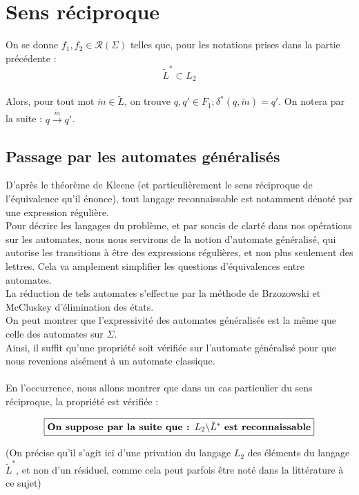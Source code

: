 \documentclass{article}
\begin{document}
\section{Sens réciproque}
On se donne $f_1,f_2 \in \mathcal{R}(\Sigma)$ telles que, pour les notations prises dans la partie précédente :
$$\tilde{L}^* \subset L_2$$
\\
Alors, pour tout mot $\tilde{m} \in \tilde{L}$, on trouve $q,q' \in F_1 ; \delta^*(q,\tilde{m}) = q'$. On notera par la suite : $q \xrightarrow{\tilde{m}} q'$.
\\
\subsection{Passage par les automates généralisés}

D'après le théorème de Kleene (et particulièrement le sens réciproque de l'équivalence qu'il énonce), tout langage reconnaissable est notamment dénoté par une expression régulière.
\\
Pour décrire les langages du problème, et par soucis de clarté dans nos opérations sur les automates, nous nous servirons de la notion d'automate généralisé, qui autorise les transitions à être des expressions régulières, et non plus seulement des lettres. Cela va amplement simplifier les questions d'équivalences entre automates.
\\
La réduction de tels automates s'effectue par la méthode de Brzozowski et McCluskey d'élimination des états.
\\
On peut montrer que l'expressivité des automates généralisés est la même que celle des automates sur $\Sigma$.
\\
Ainsi, il suffit qu'une propriété soit vérifiée sur l'automate généralisé pour que nous revenions aisément à un automate classique.
\\
\\
En l'occurrence, nous allons montrer que dans un cas particulier du sens réciproque, la propriété est vérifiée :

$$\boxed{\textup{\textbf{On suppose par la suite que : }} L_2 \backslash \tilde{L}^* \textup{ \textbf{est reconnaissable}}}$$

(On précise qu'il s'agit ici d'une privation du langage $L_2$ des éléments du langage $\tilde{L}^*$, et non d'un résiduel, comme cela peut parfois être noté dans la littérature à ce sujet)
\end{document}
